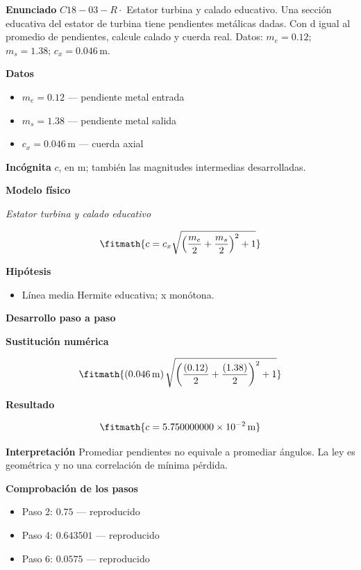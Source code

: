 \documentclass[10pt,openany]{book}
\begin{document}
\begin{tcolorbox}[title={Problema resuelto 3}, studiumworked, breakable]

\noindent\textbf{Enunciado}
\(C18-03-R \cdot\) Estator turbina y calado educativo. Una sección educativa del estator de turbina tiene pendientes metálicas dadas. Con d igual al promedio de pendientes, calcule calado y cuerda real. Datos: \(m_e=0.12\); \(m_s=1.38\); \(c_x=0.046\, \mathrm{m}\).

\noindent\textbf{Datos}
\begin{itemize}
\item $m_e = 0.12$ — pendiente metal entrada
\item $m_s = 1.38$ — pendiente metal salida
\item $c_x = 0.046\,\mathrm{m}$ — cuerda axial
\end{itemize}

\noindent\textbf{Incógnita}
$c$, en $\mathrm{m}$; también las magnitudes intermedias desarrolladas.

\noindent\textbf{Modelo físico}

\noindent\textit{Estator turbina y calado educativo}

\[
\fitmath{c=c_x \sqrt{\left(\frac{m_e}{2} + \frac{m_s}{2}\right)^{2} + 1}}
\]

\noindent\textbf{Hipótesis}
\begin{itemize}
\item Línea media Hermite educativa; x monótona.
\end{itemize}

\noindent\textbf{Desarrollo paso a paso}



\noindent\textbf{Sustitución numérica}

\[
\fitmath{\left(0.046\,\mathrm{m}\right) \sqrt{\left(\frac{\left(0.12\right)}{2} + \frac{\left(1.38\right)}{2}\right)^{2} + 1}}
\]

\noindent\textbf{Resultado}

\[
\fitmath{c=5.750000000\times10^{-2}\,\mathrm{m}}
\]

\noindent\textbf{Interpretación}
Promediar pendientes no equivale a promediar ángulos. La ley es geométrica y no una correlación de mínima pérdida.

\noindent\textbf{Comprobación de los pasos}
\begin{itemize}
\item Paso 2: $0.75$ — reproducido
\item Paso 4: $0.643501$ — reproducido
\item Paso 6: $0.0575$ — reproducido
\end{itemize}


\end{tcolorbox}
\end{document}
